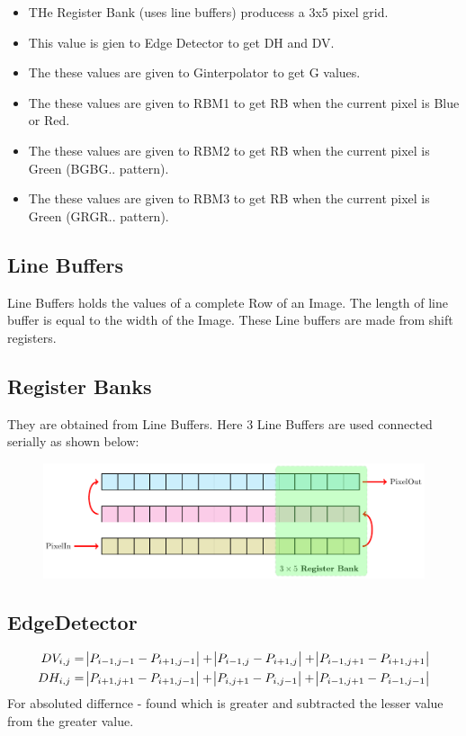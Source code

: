 \documentclass{article}
\begin{document}
\begin{itemize}
    \item THe Register Bank (uses line buffers) producess a 3x5 pixel grid.
    \item This value is gien to Edge Detector to get DH and DV.
    \item The these values are given to Ginterpolator to get G values.
    \item The these values are given to RBM1 to get RB when the current pixel is Blue or Red.
    \item The these values are given to RBM2 to get RB when the current pixel is Green (BGBG.. pattern).
    \item The these values are given to RBM3 to get RB when the current pixel is Green (GRGR.. pattern).
\end{itemize}

\subsection{Line Buffers}
Line Buffers holds the values of a complete Row of an Image.
The length of line buffer is equal to the width of the Image.
These Line buffers are made from shift registers.

\subsection{Register Banks}
They are obtained from Line Buffers.
Here 3 Line Buffers are used connected serially as shown below:

\begin{figure}[H]
    \centering
    \includegraphics[scale=0.8]{DocResources/RegisterBankCreation.pdf}
\end{figure}


\subsection{EdgeDetector}
\begin{align}
    DV_{i,j} & = \abs{P_{i-1, j-1} - P_{i+1,j-1}} + \abs{P_{i-1, j} - P_{i+1,j}} + \abs{P_{i-1, j+1} - P_{i+1,j+1}} \\
    DH_{i,j} & = \abs{P_{i+1, j+1} - P_{i+1,j-1}} + \abs{P_{i, j+1} - P_{i,j-1}} + \abs{P_{i-1, j+1} - P_{i-1,j-1}}
\end{align}
For absoluted differnce - found which is greater and subtracted the lesser value from the greater value.
\end{document}
